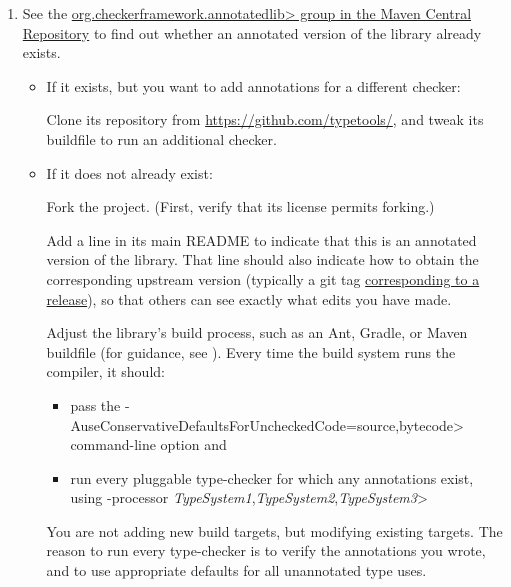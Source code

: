 \begin{enumerate}
\item See the
  \href{https://central.sonatype.com/search?q=org.checkerframework.annotatedlib}{\<org.checkerframework.annotatedlib>
    group in the Maven Central Repository}
  to find out whether an annotated version of the library already exists.

  \begin{itemize}
  \item
    If it exists, but you want to add annotations for a different checker:

    Clone its repository from \url{https://github.com/typetools/}, and tweak
    its buildfile to run an additional checker.

  \item
    If it does not already exist:

    Fork the project.  (First, verify that its license permits forking.)

    Add a line in its main README to indicate that this is an annotated
    version of the library.  That line should also indicate how to obtain
    the corresponding upstream version (typically a git tag
    \href{https://checkerframework.org/manual/developer-manual.html#annotated-library-version-numbers}{corresponding
      to a release}), so that others can see exactly what edits you have
    made.

  Adjust the library's
  build process, such as an Ant, Gradle, or Maven buildfile (for guidance,
  see ).
    Every time the build system runs the compiler, it should:
    \begin{itemize}
    \item
      pass the \<-AuseConservativeDefaultsForUncheckedCode=source,bytecode>
      command-line option and
    \item
      run every pluggable type-checker for which any
      annotations exist, using \<-processor
      \emph{TypeSystem1},\emph{TypeSystem2},\emph{TypeSystem3}>
    \end{itemize}

  You are not adding new build targets, but modifying existing targets.
  The reason to run every type-checker is to verify
  the annotations you wrote, and to use appropriate defaults for all
  unannotated type uses.
  \end{itemize}


\end{enumerate}
